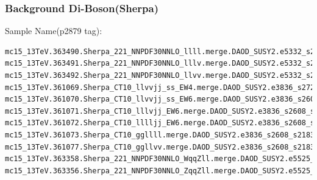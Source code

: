 \documentclass[mathserif,serif]{beamer}
\begin{document}
\begin{frame}[fragile]
\frametitle{Background Di-Boson(Sherpa)}
\small
Sample Name(p2879 tag):
\tiny
\begin{verbatim}
mc15_13TeV.363490.Sherpa_221_NNPDF30NNLO_llll.merge.DAOD_SUSY2.e5332_s2726_r7772_r7676_p2879
mc15_13TeV.363491.Sherpa_221_NNPDF30NNLO_lllv.merge.DAOD_SUSY2.e5332_s2726_r7772_r7676_p2879
mc15_13TeV.363492.Sherpa_221_NNPDF30NNLO_llvv.merge.DAOD_SUSY2.e5332_s2726_r7772_r7676_p2879
mc15_13TeV.361069.Sherpa_CT10_llvvjj_ss_EW4.merge.DAOD_SUSY2.e3836_s2726_r7772_r7676_p2879
mc15_13TeV.361070.Sherpa_CT10_llvvjj_ss_EW6.merge.DAOD_SUSY2.e3836_s2608_r7772_r7676_p2879
mc15_13TeV.361071.Sherpa_CT10_lllvjj_EW6.merge.DAOD_SUSY2.e3836_s2608_s2183_r7772_r7676_p2879
mc15_13TeV.361072.Sherpa_CT10_lllljj_EW6.merge.DAOD_SUSY2.e3836_s2608_s2183_r7772_r7676_p2879
mc15_13TeV.361073.Sherpa_CT10_ggllll.merge.DAOD_SUSY2.e3836_s2608_s2183_r7772_r7676_p2879
mc15_13TeV.361077.Sherpa_CT10_ggllvv.merge.DAOD_SUSY2.e3836_s2608_s2183_r7772_r7676_p2879
mc15_13TeV.363358.Sherpa_221_NNPDF30NNLO_WqqZll.merge.DAOD_SUSY2.e5525_s2726_r7772_r7676_p2879
mc15_13TeV.363356.Sherpa_221_NNPDF30NNLO_ZqqZll.merge.DAOD_SUSY2.e5525_s2726_r7772_r7676_p2879
\end{verbatim}
\end{frame}
\end{document}

